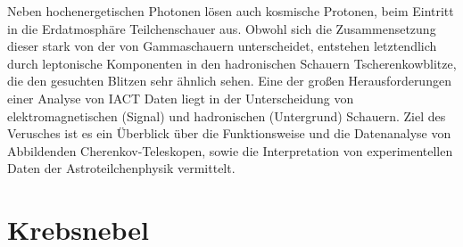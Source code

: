 Neben hochenergetischen Photonen lösen auch kosmische Protonen,
beim Eintritt in die Erdatmosphäre Teilchenschauer aus.
Obwohl sich die Zusammensetzung dieser stark von der von Gammaschauern unterscheidet,
entstehen letztendlich durch leptonische Komponenten in den hadronischen Schauern Tscherenkowblitze,
die den gesuchten Blitzen sehr ähnlich sehen.
Eine der großen Herausforderungen einer Analyse von IACT Daten liegt in der Unterscheidung von elektromagnetischen (Signal) und  hadronischen (Untergrund) Schauern.
Ziel des Verusches ist es ein Überblick über die Funktionsweise 
und die Datenanalyse von Abbildenden Cherenkov-Teleskopen, 
sowie die Interpretation von experimentellen Daten 
der Astroteilchenphysik vermittelt.

\section*{Krebsnebel}%
\label{sec:krebsnebel}

